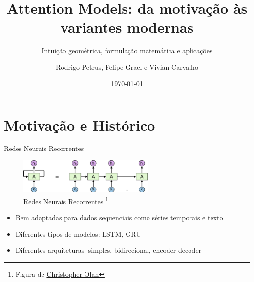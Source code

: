 \documentclass{beamer}
\title{Attention Models: da motivação às variantes modernas}
\subtitle{Intuição geométrica, formulação matemática e aplicações}
\author{Rodrigo Petrus, Felipe Grael e Vivian Carvalho}
\date{\today}
\begin{document}
\maketitle


\section{Motivação e Histórico}


\begin{frame}{Redes Neurais Recorrentes}

	\begin{figure}[h]
		\centering
		\includegraphics[width=0.6\textwidth]{assets/colah-RNN-unrolled.png}
		\caption{Redes Neurais Recorrentes \footnote{Figura de \href{https://colah.github.io/posts/2015-08-Understanding-LSTMs/}{Christopher Olah}}}
	\end{figure}

	\begin{itemize}
		\item Bem adaptadas para dados sequenciais como séries temporais e texto
		\item Diferentes tipos de modelos: LSTM, GRU
		\item Diferentes arquiteturas: simples, bidirecional, encoder-decoder
	\end{itemize}

\end{frame}
\end{document}
